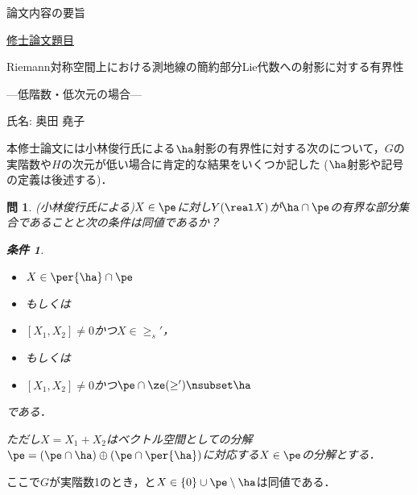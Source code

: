 \documentclass[12pt,dvipdfmx,uplatex]{jsarticle}
\newcounter{countabst}
\newtheorem{prob-a}[countabst]{問}
\newtheorem{cond-a}[countabst]{条件}
\begin{document}
% 
\begin{center}
  論文内容の要旨
\end{center}

\noindent\underline{修士論文題目}
\vspace{-1em}
\begin{center}
  Riemann対称空間上における測地線の簡約部分Lie代数への射影に対する有界性

  ---低階数・低次元の場合---
\end{center}
\vspace{-0.5em}

\noindent 氏名: 奥田 堯子

\vspace{0.5em}

本修士論文には小林俊行氏による$\ha$射影の有界性に対する次のについて，$G$の実階数や$H$の次元が低い場合に肯定的な結果をいくつか記した ($\ha$射影や記号の定義は後述する)．

\begin{prob-a}(小林俊行氏による)\label{prob:1121}
  $X\in \pe$に対し$Y(\real X)$が$ \ha\cap \pe$の有界な部分集合であることと次の条件は同値であるか？
  \begin{cond-a}\label{cond:a}
    \leavevmode\vspace{-1em}
    \begin{itemize}
    \item $X\in \per{\ha}\cap\pe $
    \item[] もしくは
    \item $[X_1, X_2] \neq 0 $かつ$X\in \ge_{s}' $，
    \item[] もしくは
    \item $[X_1, X_2] \neq 0 $かつ$\pe\cap \ze(\ge') \nsubset \ha  $
    \end{itemize}
    である．
  \end{cond-a}

  ただし$X = X_1 + X_2 $はベクトル空間としての分解$\pe =(\pe\cap \ha)\oplus(\pe\cap\per{\ha}) $に対応する$X\in \pe$の分解とする．
\end{prob-a}
\vspace{-0.5em}
ここで$G$が実階数1のとき，と$X\in \{0\}\cup\pe\setminus\ha $は同値である．
\end{document}
